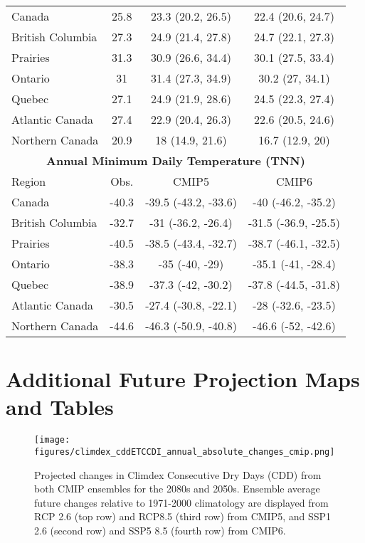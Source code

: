 \documentclass[]{scrartcl}
\begin{document}
\begin{appendices}
\begin{table}[t]
\begin{center}
\begin{tabular}{|l|ccc|}
			\hline
			Canada & 25.8 & 23.3 (20.2, 26.5) & 22.4 (20.6, 24.7) \\ 
			British Columbia & 27.3 & 24.9 (21.4, 27.8) & 24.7 (22.1, 27.3) \\ 
			Prairies & 31.3 & 30.9 (26.6, 34.4) & 30.1 (27.5, 33.4) \\ 
			Ontario & 31 & 31.4 (27.3, 34.9) & 30.2 (27, 34.1) \\ 
			Quebec & 27.1 & 24.9 (21.9, 28.6) & 24.5 (22.3, 27.4) \\ 
			Atlantic Canada & 27.4 & 22.9 (20.4, 26.3) & 22.6 (20.5, 24.6) \\ 
			Northern Canada & 20.9 & 18 (14.9, 21.6) & 16.7 (12.9, 20) \\ 
			\hline	
			\multicolumn{4}{|c|}{\textbf{Annual Minimum Daily Temperature (TNN)}} \\
			\hline
			Region & Obs. & CMIP5 & CMIP6   \\
			\hline
			Canada & -40.3 & -39.5 (-43.2, -33.6) & -40 (-46.2, -35.2) \\ 
			British Columbia & -32.7 & -31 (-36.2, -26.4) & -31.5 (-36.9, -25.5) \\ 
			Prairies & -40.5 & -38.5 (-43.4, -32.7) & -38.7 (-46.1, -32.5) \\ 
			Ontario & -38.3 & -35 (-40, -29) & -35.1 (-41, -28.4) \\ 
			Quebec & -38.9 & -37.3 (-42, -30.2) & -37.8 (-44.5, -31.8) \\ 
			Atlantic Canada & -30.5 & -27.4 (-30.8, -22.1) & -28 (-32.6, -23.5) \\ 
			Northern Canada & -44.6 & -46.3 (-50.9, -40.8) & -46.6 (-52, -42.6) \\ 
			\hline	
		\end{tabular}
	\end{center}
\end{table}

\clearpage

\section{Additional Future Projection Maps and Tables}\label{added_proj}
	
\begin{figure}[ht!]
	\centering
	\texttt{[image: figures/climdex\_cddETCCDI\_annual\_absolute\_changes\_cmip.png]}
	\caption[CDD]{Projected changes in Climdex Consecutive Dry Days (CDD) from both CMIP ensembles for the 2080s and 2050s. Ensemble average future changes relative to 1971-2000 climatology are displayed from RCP 2.6 (top row) and RCP8.5 (third row) from CMIP5, and SSP1 2.6 (second row) and SSP5 8.5 (fourth row) from CMIP6.}
	\label{fig:climdex_cdd_future}
\end{figure}


\end{appendices}
\end{document}
